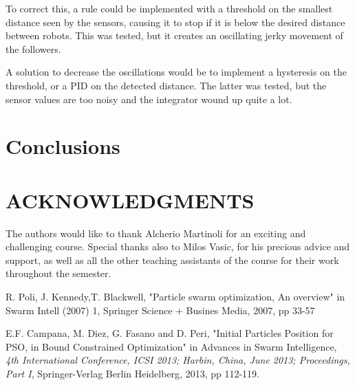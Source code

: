 \documentclass[a4paper, 10pt, conference]{ieeeconf}      %
\begin{document}
To correct this, a rule could be implemented with a threshold on the smallest distance seen by the sensors, causing it to stop if it is below the desired distance between robots. This was tested, but it creates an oscillating jerky movement of the followers. 

A solution to decrease the oscillations would be to implement a hysteresis on the threshold, or a PID on the detected distance. The latter was tested, but the sensor values are too noisy and the integrator wound up quite a lot. 

\section{Conclusions}

\section{ACKNOWLEDGMENTS}
The authors would like to thank Alcherio Martinoli for an exciting and challenging course. Special thanks also to Milos Vasic, for his precious advice and support, as well as all the other teaching assistants of the course for their work throughout the semester.

\begin{thebibliography}{99}
R. Poli, J. Kennedy,T. Blackwell, "Particle swarm optimization, An overview" in Swarm Intell (2007) 1, Springer Science + Busines Media, 2007, pp 33-57

E.F. Campana, M. Diez, G. Fasano and D. Peri, "Initial Particles Position for PSO,
in Bound Constrained Optimization" in Advances in Swarm Intelligence, {\it 4th International Conference, ICSI 2013; Harbin, China, June 2013; Proceedings, Part I}, Springer-Verlag Berlin Heidelberg, 2013, pp 112-119.



\end{thebibliography}
\end{document}
